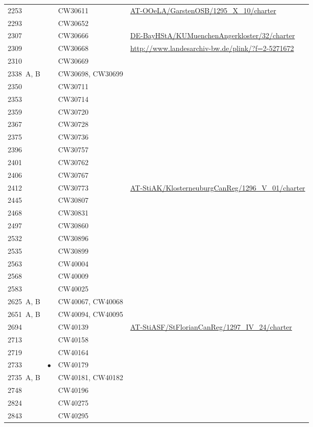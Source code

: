 \begin{xltabular}{\linewidth}{@{} l c l X @{}}
2253	&           & CW30611
		& \url{AT-OOeLA/GarstenOSB/1295_X_10/charter}
	\\
2293	&           & CW30652 \\
2307	&           & CW30666
		& \url{DE-BayHStA/KUMuenchenAngerkloster/32/charter}
	\\
2309	&           & CW30668
		& \url{http://www.landesarchiv-bw.de/plink/?f=2-5271672}
	\\
2310	&           & CW30669 \\
2338~A, B	&            & CW30698, CW30699 \\
2350	&           & CW30711 \\
2353	&           & CW30714 \\
2359	&           & CW30720 \\
2367	&           & CW30728 \\
2375	&           & CW30736 \\
2396	&           & CW30757 \\
2401	&           & CW30762 \\
2406	&           & CW30767 \\
2412	&           & CW30773
		& \url{AT-StiAK/KlosterneuburgCanReg/1296_V_01/charter}
	\\
2445	&           & CW30807 \\
2468	&           & CW30831 \\
2497	&           & CW30860 \\
2532	&           & CW30896 \\
2535	&           & CW30899 \\
2563	&           & CW40004 \\
2568	&           & CW40009 \\
2583	&           & CW40025 \\
2625~A, B	&           & CW40067, CW40068 \\
2651~A, B	&           & CW40094, CW40095 \\
2694	&           & CW40139
		& \url{AT-StiASF/StFlorianCanReg/1297_IV_24/charter}
	\\
2713	&           & CW40158 \\
2719	&           & CW40164 \\
2733	& $\bullet$ & CW40179 \\
2735~A, B	&           & CW40181, CW40182 \\
2748	&           & CW40196 \\
2824	&           & CW40275 \\
2843	&           & CW40295

\end{xltabular}
